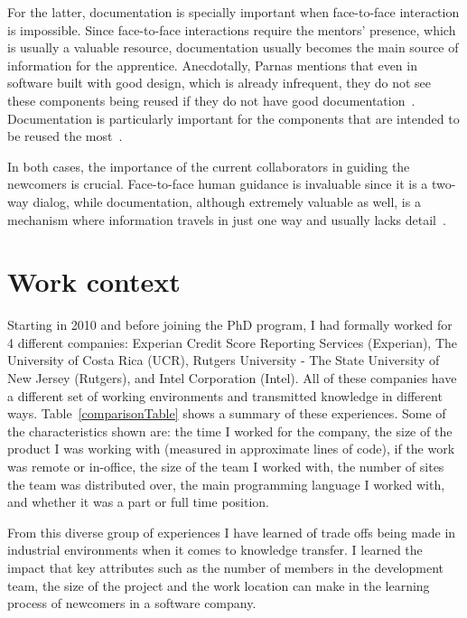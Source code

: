 \documentclass[12pt, letterpaper]{article}
\begin{document}
For the latter,
documentation is specially important when face-to-face interaction is impossible. Since face-to-face interactions
require the mentors' presence, which is usually a valuable resource, documentation usually
becomes the main source of information for the apprentice. Anecdotally, Parnas mentions that even
in software built with good design, which is already infrequent, they do not see these components being
reused if they do not have good documentation~\cite{brooks95}. Documentation is particularly important 
for the components that are intended to be reused the most~\cite{monperrus11}.

In both cases, the importance of the current collaborators in guiding the newcomers is crucial.
Face-to-face human guidance is invaluable since it is a two-way dialog, while documentation,
although extremely valuable as well, is a mechanism
where information travels in just one way and usually lacks detail~\cite{Dagenais10}.
 
\section{Work context}
Starting in 2010 and before joining the PhD program, I had formally worked for 4 different companies: Experian Credit 
Score Reporting Services (Experian), The University of Costa Rica (UCR), Rutgers University - The State University of New 
Jersey (Rutgers), and Intel Corporation (Intel). All of these companies 
have a different set of working environments and transmitted knowledge in different ways. Table~\ref{comparisonTable}
shows a summary of
these experiences. Some of the characteristics shown are: 
the time I worked for the company, the 
size of the product I was working with (measured in approximate lines of code), if the work was remote or in-office, the size of the 
team I worked with, the number of sites the team was distributed over, the main programming language I worked with,
and whether it was a part or full time position.

From this diverse group of experiences I have learned of trade offs being made in industrial environments
when it comes to knowledge transfer. I learned the impact that key attributes such as the number of members in the 
development team, the size of the project and the work location can make in the learning process of newcomers in a
software company. 
\end{document}
